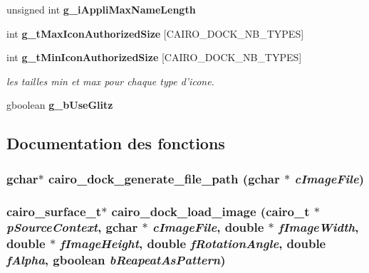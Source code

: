 \begin{CompactItemize}
unsigned int {\bf g\_\-i\-Appli\-Max\-Name\-Length}
\item 
int {\bf g\_\-t\-Max\-Icon\-Authorized\-Size} [CAIRO\_\-DOCK\_\-NB\_\-TYPES]
\item 
int {\bf g\_\-t\-Min\-Icon\-Authorized\-Size} [CAIRO\_\-DOCK\_\-NB\_\-TYPES]
\begin{CompactList}\small\item\em les tailles min et max pour chaque type d'icone. \item\end{CompactList}\item 
gboolean {\bf g\_\-b\-Use\-Glitz}
\end{CompactItemize}


\subsection{Documentation des fonctions}
\subsubsection{\setlength{\rightskip}{0pt plus 5cm}gchar$\ast$ cairo\_\-dock\_\-generate\_\-file\_\-path (gchar $\ast$ {\em c\-Image\-File})}\label{cairo-dock-load_8c_7c32138319b7720c1dc03948223ad14b}


\subsubsection{\setlength{\rightskip}{0pt plus 5cm}cairo\_\-surface\_\-t$\ast$ cairo\_\-dock\_\-load\_\-image (cairo\_\-t $\ast$ {\em p\-Source\-Context}, gchar $\ast$ {\em c\-Image\-File}, double $\ast$ {\em f\-Image\-Width}, double $\ast$ {\em f\-Image\-Height}, double {\em f\-Rotation\-Angle}, double {\em f\-Alpha}, gboolean {\em b\-Reapeat\-As\-Pattern})}\label{cairo-dock-load_8c_9f99a2ad5d78bae91031bdad24116375}


